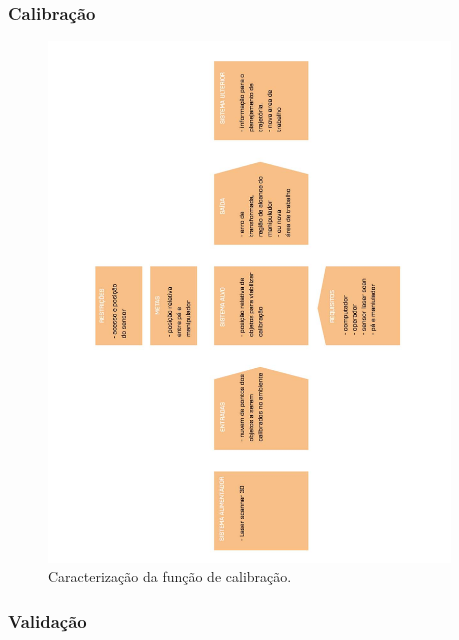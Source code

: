 \documentclass[12pt,a4paper]{article}
\begin{document}
\subsubsection {Calibração}

\begin{figure}[H]
\begin{center}
  \includegraphics[width=0.95\textwidth]{figs/caracterizacao_calibracao.jpg}
  \caption{Caracterização da função de calibração.}
  \label{fig:caracterização calibração}
\end{center}
\end{figure} 

\subsubsection {Validação}
\end{document}
